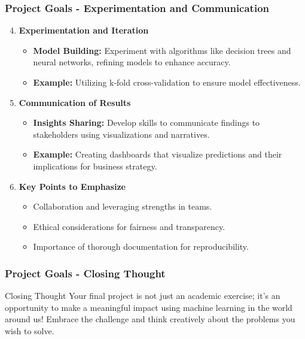 \documentclass[aspectratio=169]{beamer}
\begin{document}
\begin{frame}[fragile]
    \frametitle{Project Goals - Experimentation and Communication}
    \begin{enumerate}
        \setcounter{enumi}{3}
        \item \textbf{Experimentation and Iteration}
        \begin{itemize}
            \item \textbf{Model Building:} Experiment with algorithms like decision trees and neural networks, refining models to enhance accuracy.
            \item \textbf{Example:} Utilizing k-fold cross-validation to ensure model effectiveness.
        \end{itemize}

        \item \textbf{Communication of Results}
        \begin{itemize}
            \item \textbf{Insights Sharing:} Develop skills to communicate findings to stakeholders using visualizations and narratives.
            \item \textbf{Example:} Creating dashboards that visualize predictions and their implications for business strategy.
        \end{itemize}

        \item \textbf{Key Points to Emphasize}
        \begin{itemize}
            \item Collaboration and leveraging strengths in teams.
            \item Ethical considerations for fairness and transparency.
            \item Importance of thorough documentation for reproducibility.
        \end{itemize}
    \end{enumerate}
\end{frame}

\begin{frame}[fragile]
    \frametitle{Project Goals - Closing Thought}
    \begin{block}{Closing Thought}
        Your final project is not just an academic exercise; it's an opportunity to make a meaningful impact using machine learning in the world around us! Embrace the challenge and think creatively about the problems you wish to solve.
    \end{block}
\end{frame}
\end{document}
